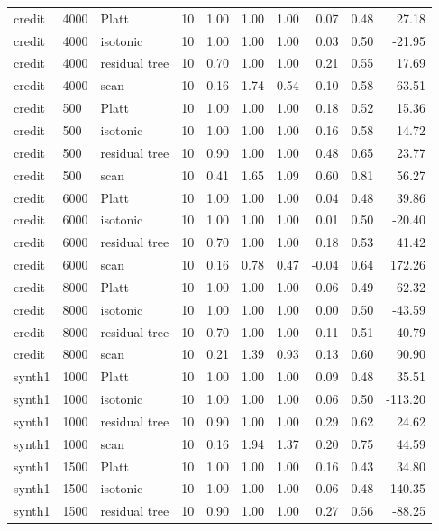 \begin{tabular}{lllrrrrrrr}
credit & 4000 & Platt & 10 & 1.00 & 1.00 & 1.00 & 0.07 & 0.48 & 27.18 \\
credit & 4000 & isotonic & 10 & 1.00 & 1.00 & 1.00 & 0.03 & 0.50 & -21.95 \\
credit & 4000 & residual tree & 10 & 0.70 & 1.00 & 1.00 & 0.21 & 0.55 & 17.69 \\
credit & 4000 & scan & 10 & 0.16 & 1.74 & 0.54 & -0.10 & 0.58 & 63.51 \\
credit & 500 & Platt & 10 & 1.00 & 1.00 & 1.00 & 0.18 & 0.52 & 15.36 \\
credit & 500 & isotonic & 10 & 1.00 & 1.00 & 1.00 & 0.16 & 0.58 & 14.72 \\
credit & 500 & residual tree & 10 & 0.90 & 1.00 & 1.00 & 0.48 & 0.65 & 23.77 \\
credit & 500 & scan & 10 & 0.41 & 1.65 & 1.09 & 0.60 & 0.81 & 56.27 \\
credit & 6000 & Platt & 10 & 1.00 & 1.00 & 1.00 & 0.04 & 0.48 & 39.86 \\
credit & 6000 & isotonic & 10 & 1.00 & 1.00 & 1.00 & 0.01 & 0.50 & -20.40 \\
credit & 6000 & residual tree & 10 & 0.70 & 1.00 & 1.00 & 0.18 & 0.53 & 41.42 \\
credit & 6000 & scan & 10 & 0.16 & 0.78 & 0.47 & -0.04 & 0.64 & 172.26 \\
credit & 8000 & Platt & 10 & 1.00 & 1.00 & 1.00 & 0.06 & 0.49 & 62.32 \\
credit & 8000 & isotonic & 10 & 1.00 & 1.00 & 1.00 & 0.00 & 0.50 & -43.59 \\
credit & 8000 & residual tree & 10 & 0.70 & 1.00 & 1.00 & 0.11 & 0.51 & 40.79 \\
credit & 8000 & scan & 10 & 0.21 & 1.39 & 0.93 & 0.13 & 0.60 & 90.90 \\
synth1 & 1000 & Platt & 10 & 1.00 & 1.00 & 1.00 & 0.09 & 0.48 & 35.51 \\
synth1 & 1000 & isotonic & 10 & 1.00 & 1.00 & 1.00 & 0.06 & 0.50 & -113.20 \\
synth1 & 1000 & residual tree & 10 & 0.90 & 1.00 & 1.00 & 0.29 & 0.62 & 24.62 \\
synth1 & 1000 & scan & 10 & 0.16 & 1.94 & 1.37 & 0.20 & 0.75 & 44.59 \\
synth1 & 1500 & Platt & 10 & 1.00 & 1.00 & 1.00 & 0.16 & 0.43 & 34.80 \\
synth1 & 1500 & isotonic & 10 & 1.00 & 1.00 & 1.00 & 0.06 & 0.48 & -140.35 \\
synth1 & 1500 & residual tree & 10 & 0.90 & 1.00 & 1.00 & 0.27 & 0.56 & -88.25 \\

\end{tabular}
